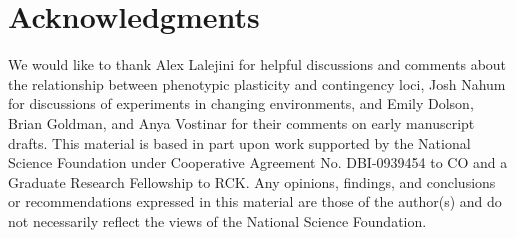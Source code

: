 \documentclass[10pt,letterpaper]{article}
\begin{document}
\section*{Acknowledgments}
We would like to thank Alex Lalejini for helpful discussions and comments about the relationship between phenotypic plasticity and contingency loci, Josh Nahum for discussions of experiments in changing environments, and Emily Dolson, Brian Goldman, and Anya Vostinar for their comments on early manuscript drafts.
This material is based in part upon work supported by the National Science Foundation under Cooperative Agreement No. DBI-0939454 to CO and a Graduate Research Fellowship to RCK. Any opinions, findings, and conclusions or recommendations expressed in this material are those of the author(s) and do not necessarily reflect the views of the National Science Foundation.

%

\end{document}
